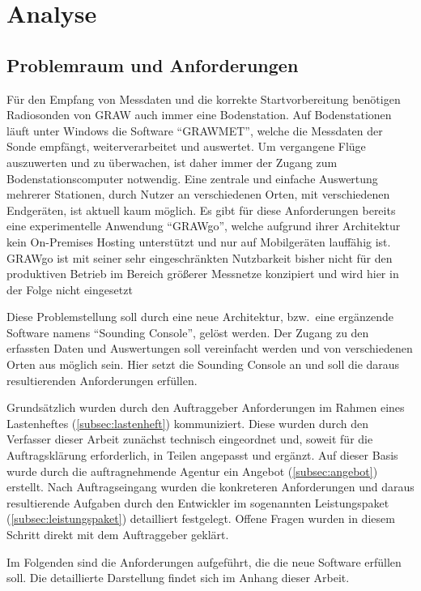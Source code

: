 \section{Analyse}

\subsection{Problemraum und Anforderungen}
Für den Empfang von Messdaten und die korrekte Startvorbereitung benötigen Radiosonden von GRAW auch immer eine Bodenstation.
Auf Bodenstationen läuft unter Windows die Software \enquote{GRAWMET}\cite{grawmet}, welche die Messdaten der Sonde empfängt, weiterverarbeitet und auswertet.
Um vergangene Flüge auszuwerten und zu überwachen, ist daher immer der Zugang zum Bodenstationscomputer notwendig.
Eine zentrale und einfache Auswertung mehrerer Stationen, durch Nutzer an verschiedenen Orten, mit verschiedenen Endgeräten, ist aktuell kaum möglich.
Es gibt für diese Anforderungen bereits eine experimentelle Anwendung \enquote{GRAWgo}\cite{grawgo}, welche aufgrund ihrer Architektur kein On-Premises Hosting unterstützt und nur auf Mobilgeräten lauffähig ist.
GRAWgo ist mit seiner sehr eingeschränkten Nutzbarkeit bisher nicht für den produktiven Betrieb im Bereich größerer Messnetze konzipiert und wird hier in der Folge nicht eingesetzt

Diese Problemstellung soll durch eine neue Architektur, bzw.\ eine ergänzende Software namens \enquote{Sounding Console}, gelöst werden.
Der Zugang zu den erfassten Daten und Auswertungen soll vereinfacht werden und von verschiedenen Orten aus möglich sein.
Hier setzt die Sounding Console an und soll die daraus resultierenden Anforderungen erfüllen.

Grundsätzlich wurden durch den Auftraggeber Anforderungen im Rahmen eines Lastenheftes (\ref{subsec:lastenheft}) kommuniziert.
Diese wurden durch den Verfasser dieser Arbeit zunächst technisch eingeordnet und, soweit für die Auftragsklärung erforderlich, in Teilen angepasst und ergänzt.
Auf dieser Basis wurde durch die auftragnehmende Agentur ein Angebot (\ref{subsec:angebot}) erstellt.
Nach Auftragseingang wurden die konkreteren Anforderungen und daraus resultierende Aufgaben durch den Entwickler im sogenannten Leistungspaket (\ref{subsec:leistungspaket}) detailliert festgelegt.
Offene Fragen wurden in diesem Schritt direkt mit dem Auftraggeber geklärt.

Im Folgenden sind die Anforderungen aufgeführt, die die neue Software erfüllen soll.
Die detaillierte Darstellung findet sich im Anhang dieser Arbeit.

